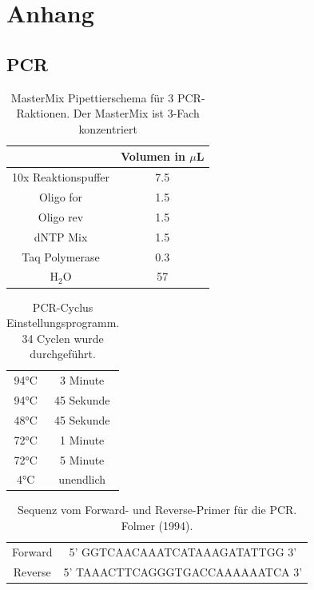 \documentclass[oneside,10pt,a4paper]{report}
\begin{document}
	
	\chapter{Anhang}
		\section{PCR}
		\begin{table}[H]
			\centering
			\caption{MasterMix Pipettierschema für 3 PCR-Raktionen. Der MasterMix ist 3-Fach konzentriert}
			\label{tab: Mastermix-Pipettierschema}
			\begin{tabular}{cc}
				\toprule
				& Volumen in $\mu$L\\
				\midrule
				10x Reaktionspuffer & 7.5 \\
				Oligo for & 1.5\\
				Oligo rev & 1.5\\
				dNTP Mix & 1.5\\
				Taq Polymerase & 0.3\\
				H$_2$O & 57\\
				\bottomrule
			\end{tabular}
		\end{table}
		
		\begin{table}[H]
			\centering
			\caption{PCR-Cyclus Einstellungsprogramm. 34 Cyclen wurde durchgeführt.}
			\label{tab: PCR-Cyclen}
			\begin{tabular}{cc}
				\toprule
				94°C & 3 Minute\\
				94°C & 45 Sekunde\\
				48°C & 45 Sekunde\\
				72°C & 1 Minute\\
				72°C & 5 Minute\\
				4°C & unendlich\\
				\bottomrule
			\end{tabular}
		\end{table}
		
		\begin{table}[H]
			\centering
			\caption{Sequenz vom Forward- und Reverse-Primer für die PCR. Folmer (1994).}
			\label{tab: Primer}
			\begin{tabular}{cc}
				Forward & 5’ GGTCAACAAATCATAAAGATATTGG 3'\\
				Reverse & 5’ TAAACTTCAGGGTGACCAAAAAATCA 3’\\				
			\end{tabular}
		\end{table}
		
\end{document}

